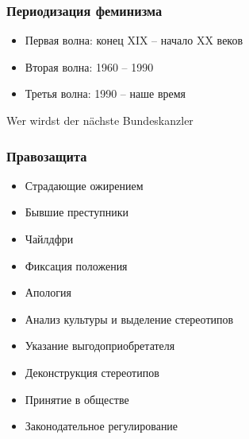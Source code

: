 \documentclass[aspectratio=169]{beamer}
\begin{document}
\begin{bframe}\frametitle{Периодизация феминизма}
\begin{itemize}
\item<+-> Первая волна: конец XIX -- начало XX веков
\item<+-> Вторая волна: 1960 -- 1990
\item<+-> Третья волна: 1990 -- наше время
\end{itemize}
\end{bframe}

\begin{bframe}

\begin{center}
Wer wirdst der n\"achste Bundeskanzler
\end{center}
\end{bframe}

\begin{bframe}
\begin{center}
\end{center}
\end{bframe}

\begin{frame}\frametitle{Правозащита}


\begin{itemize}
\item<+-> Страдающие ожирением
\item<+-> Бывшие преступники
\item<+-> Чайлдфри
\end{itemize}

\begin{itemize}
\item<+-> Фиксация положения
\item<+-> Апология
\item<+-> Анализ культуры и выделение стереотипов
\item<+-> Указание выгодоприобретателя
\item<+-> Деконструкция стереотипов
\item<+-> Принятие в обществе
\item<+-> Законодательное регулирование
\end{itemize}

\end{frame}
\end{document}
